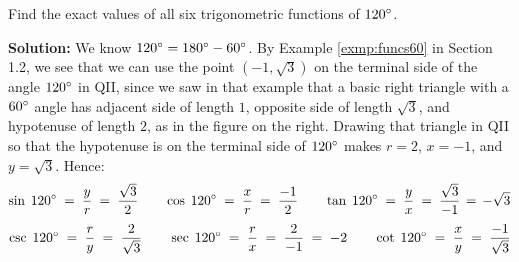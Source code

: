 \newpage
\begin{exmp}\label{exmp:funcs120}
\noindent Find the exact values of all six trigonometric functions of $120^\circ$.\vspace{1mm}
 \par\noindent\textbf{Solution:} We know $120^\circ = 180^\circ - 60^\circ$. By
 Example \ref{exmp:funcs60} in Section 1.2, we see that we can use the point $(-1,\sqrt{3})$ on
 the terminal side of the angle $120^\circ$ in QII, since we saw in that example that a basic
 right triangle with a $60^\circ$ angle has adjacent side of length $1$, opposite side of length
 $\sqrt{3}$, and hypotenuse of length $2$, as in the figure on the right. Drawing that triangle in
 QII so that the hypotenuse is on the terminal side of $120^\circ$ makes $r = 2$, $x=-1$,
 and $y=\sqrt{3}$. Hence:
 \begin{displaymath}
  \sin\;120\Degrees \;=\; \dfrac{y}{r} \;=\; \dfrac{\sqrt{3}}{2} \qquad
  \cos\;120\Degrees \;=\; \dfrac{x}{r} \;=\; \dfrac{-1}{2} \qquad
  \tan\;120\Degrees \;=\; \dfrac{y}{x} \;=\; \dfrac{\sqrt{3}}{-1} \,=\, -\sqrt{3}\vspace{1mm}
 \end{displaymath}
 \begin{displaymath}
  \csc\;120\Degrees \;=\; \dfrac{r}{y} \;=\; \dfrac{2}{\sqrt{3}} \qquad
  \sec\;120\Degrees \;=\; \dfrac{r}{x} \;=\; \dfrac{2}{-1} \;=\; -2 \qquad
  \cot\;120\Degrees \;=\; \dfrac{x}{y} \;=\; \dfrac{-1}{\sqrt{3}}\vspace{1mm}
 \end{displaymath}
\end{exmp}\vspace{-4mm}
